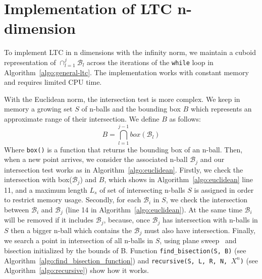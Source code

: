 \section{Implementation of LTC n-dimension}
\label{sec:implementation}
To implement LTC in n dimensions with the infinity norm, we maintain a cuboid
representation of $\cap_{l=1}^j{\mathcal{B}_l}$ across the iterations of the
\texttt{while} loop in Algorithm~\ref{algo:general-ltc}. The implementation
works with constant memory and requires limited CPU time.

With the Euclidean norm, the intersection test is more complex. We keep in
memory a growing set $S$ of n-balls and the bounding box $B$ which represents an
approximate range of their intersection. We define $B$ as follows:
\begin{equation*}
    B = \bigcap_{l=1}^{j-1} box(\mathcal{B}_l) 
\end{equation*}
Where \texttt{box()} is a function that returns the bounding box of an n-ball.
Then, when a new point arrives, we consider the associated n-ball
$\mathcal{B}_j$ and our intersection test works as in
Algorithm~\ref{algo:euclidean}.  Firstly, we check the intersection with
box($\mathcal{B}_j$) and $B$, which shows in Algorithm~\ref{algo:euclidean} line
11, and a maximum length $L_s$ of set of intersecting n-balls $S$ is assigned in
order to restrict memory usage. Secondly, for each $\mathcal{B}_i$ in $S$, we
check the intersection between $\mathcal{B}_i$ and $\mathcal{B}_j$ (line 14 in
Algorithm~\ref{algo:euclidean}). At the same time $\mathcal{B}_i$ will be
removed if it includes $\mathcal{B}_j$, because, once $\mathcal{B}_j$ has
intersection with n-balls in $S$ then a bigger n-ball which contains the
$\mathcal{B}_j$ must also have intersection.
Finally, we search a point in intersection of all n-balls in $S$, using plane
sweep~\cite{shamos1976geometric, souvaine2008line} and bisection initialized by
the bounds of B. Function \texttt{find\_bisection(S, B)} (see
Algorithm~\ref{algo:find_bisection_function}) and \texttt{recursive(S, L, R, N,
$X^n$)} (see Algorithm~\ref{algo:recursive}) show how it works. 

